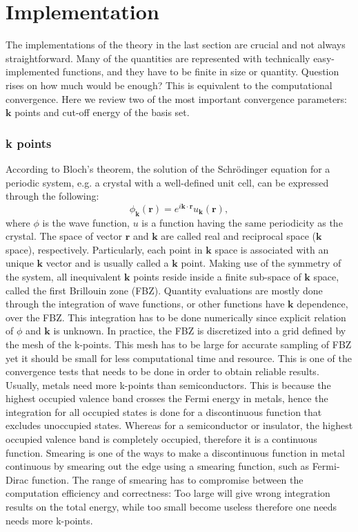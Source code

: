 \section{Implementation}
The implementations of the theory in the last section are crucial and not always straightforward. Many of the quantities are represented with technically easy-implemented functions, and they have to be finite in size or quantity. Question rises on how much would be enough? This is equivalent to the computational convergence. Here we review two of the most important convergence parameters: $\mathbf{k}$ points and cut-off energy of the basis set.
\subsubsection{k points}
According to Bloch's theorem, the solution of the Schr\"{o}dinger equation for a periodic system, e.g. a crystal with a well-defined unit cell, can be expressed through the following:
\begin{equation}\label{imp:bloch}
\phi_{\mathbf{k}}(\mathbf{r})=e^{i\mathbf{k}\cdot\mathbf{r}}u_{\mathbf{k}}(\mathbf{r}),
\end{equation}
where $\phi$ is the wave function, $u$ is a function having the same periodicity as the crystal. The space of vector $\mathbf{r}$ and $\mathbf{k}$ are called real and reciprocal space ($\mathbf{k}$ space), respectively. Particularly, each point in $\mathbf{k}$ space is associated with an unique $\mathbf{k}$ vector and is usually called a $\mathbf{k}$ point. Making use of the symmetry of the system, all inequivalent $\mathbf{k}$ points reside inside a finite sub-space of $\mathbf{k}$ space, called the first Brillouin zone (FBZ). Quantity evaluations are mostly done through the integration of wave functions, or other functions have $\mathbf{k}$ dependence, over the FBZ. This integration has to be done numerically since explicit relation of $\phi$ and $\mathbf{k}$ is unknown. In practice, the FBZ is discretized into a grid defined by the mesh of the k-points. This mesh has to be large for accurate sampling of FBZ yet it should be small for less computational time and resource. This is one of the convergence tests that needs to be done in order to obtain reliable results. Usually, metals need more k-points than semiconductors. This is because the highest occupied valence band crosses the Fermi energy in metals, hence the integration for all occupied states is done for a discontinuous function that excludes unoccupied states.  Whereas for a semiconductor or insulator, the highest occupied valence band is completely occupied, therefore it is a continuous function. Smearing is one of the ways to make a discontinuous function in metal continuous by smearing out the edge using a smearing function, such as Fermi-Dirac function. The range of smearing has to compromise between the computation efficiency and correctness: Too large will give wrong integration results on the total energy, while too small become useless therefore one needs needs more k-points.
